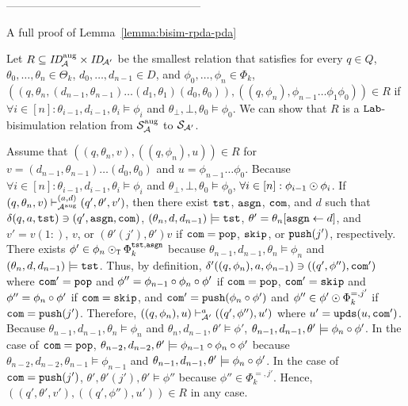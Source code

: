 -----------------------------------------------------

A full proof of Lemma~\ref{lemma:bisim-rpda-pda}

Let $R\subseteq \mathit{ID}_{\!{\cal A}}^{\mathrm{aug}}\times\mathit{ID}_{\!{\cal A}'}$
be the smallest relation
that satisfies
for every $q\in Q$, $\theta_0,\ldots,\theta_n\in\Theta_k$,
$d_0,\ldots,d_{n-1}\in D$, and $\phi_0,\ldots,\phi_n\in\Phi_k$,
$((q,\theta_n,(d_{n-1},\theta_{n-1})\allowbreak\ldots\allowbreak
(d_1,\theta_1)(d_0,\theta_0)),
((q,\phi_n),\phi_{n-1}\ldots\phi_1\phi_0))\in R$
if
$\forall i\in[n]: \theta_{i-1},d_{i-1},\theta_i\models\phi_i$ and
$\theta_{\bot},{\bot},\theta_0\models\phi_0$.
%
We can show that $R$ is a $\mathtt{Lab}$-bisimulation relation from
${\cal S}_{{\cal A}}^{\mathrm{aug}}$ to ${\cal S}_{{\cal A}'}$.

Assume that
$((q,\theta_n,v),\allowbreak ((q,\phi_n),u))\in R$
for $v=(d_{n-1},\theta_{n-1})\ldots(d_0,\theta_0)$ and
$u=\phi_{n-1}\ldots\phi_0$.
Because
$\forall i\in[n]: \theta_{i-1},d_{i-1},\theta_i\models\phi_i$ and
$\theta_{\bot},{\bot},\theta_0\models\phi_0$,
$\forall i\in[n]: \phi_{i-1}\odot\phi_i$.
%
If
$(q,\theta_n,v)\vdash_{{\cal A}^{\mathrm{aug}}}^{(a,d)}(q',\theta',v')$,
then
there exist $\mathtt{tst}$, $\mathtt{asgn}$, $\mathtt{com}$, and $d$ such that
$\delta(q,a,\mathtt{tst})\ni (q',\mathtt{asgn},\mathtt{com})$,
$(\theta_n,d,d_{n-1})\models\mathtt{tst}$,
$\theta'=\theta_n[\mathtt{asgn}\gets d]$, and
$v'=v(1{:})$, $v$, or
$(\theta'(j'),\theta')v$
if $\mathtt{com}=\mathtt{pop}$, $\mathtt{skip}$, or $\mathtt{push}(j')$, respectively.
There exists $\phi'\in\phi_n\odot_{\mathtt{T}}\Phi_k^{\mathtt{tst},\mathtt{asgn}}$ because
$\theta_{n-1},d_{n-1},\theta_n\models\phi_n$ and
$(\theta_n,d,d_{n-1})\models\mathtt{tst}$.
Thus, by definition,
$\delta'((q,\phi_n),a,\phi_{n-1})\allowbreak\ni ((q',\phi''),\mathtt{com}')$
where $\mathtt{com}'=\mathtt{pop}$ and $\phi''=\phi_{n-1}\circ\phi_n\circ\phi'$
if $\mathtt{com}=\mathtt{pop}$,
$\mathtt{com}'=\mathtt{skip}$ and $\phi''=\phi_n\circ\phi'$ if $\mathtt{com}=\mathtt{skip}$, and
$\mathtt{com}'=\mathtt{push}(\phi_n\circ\phi')$ and $\phi''\in\phi'\odot\Phi_k^{=,j'}$
if $\mathtt{com}=\mathtt{push}(j')$.
Therefore,
$((q,\phi_n),u)\vdash_{{\cal A}'}^a ((q',\phi''),u')$
where $u'=\mathtt{upds}(u,\mathtt{com}')$.
Because $\theta_{n-1},d_{n-1},\theta_n\models\phi_n$ and
$\theta_n,d_{n-1},\theta'\models\phi'$,
$\theta_{n-1},d_{n-1},\theta'\models\phi_n\circ\phi'$.
In the case of $\mathtt{com}=\mathtt{pop}$,
$\theta_{n-2},d_{n-2},\theta'\models\phi_{n-1}\circ\phi_n\circ\phi'$
because $\theta_{n-2},d_{n-2},\theta_{n-1}\models\phi_{n-1}$ and
$\theta_{n-1},d_{n-1},\theta'\models\phi_n\circ\phi'$.
In the case of $\mathtt{com}=\mathtt{push}(j')$,
$\theta',\theta'(j'),\theta'\models\phi''$
because $\phi''\in\Phi_k^{=,j'}$.
Hence, $((q',\theta',v'),((q',\phi''),\allowbreak u'))\in R$ in any case.

